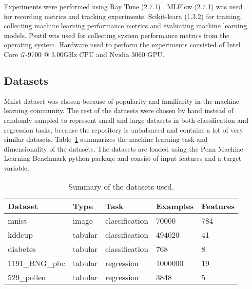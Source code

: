 Experiments were performed using Ray Tune (2.7.1) \parencite{liawTuneResearchPlatform2018}. MLFlow (2.7.1) \parencite{chenDevelopmentsMLflowSystem2020} was used for recording metrics and tracking experiments. Scikit-learn (1.3.2) \parencite{pedregosaScikitlearnMachineLearning2011} for training, collecting machine learning performance metrics and evaluating machine learning models. Psutil \parencite{rodolaGiampaoloPsutil2023} was used for collecting system performance metrics from the operating system. Hardware used to perform the experiments consisted of Intel Core i7-9700 @ 3.00GHz CPU and Nvidia 3060 GPU.

\subsection{Datasets}


Mnist dataset was chosen because of popularity and familiarity in the machine learning community. The rest of the datasets were chosen by hand instead of randomly sampled to represent small and large datasets in both classification and regression tasks, because the repository is unbalanced and contains a lot of very similar datasets. Table~\ref{table:datasets} summarizes the machine learning task and dimensionality of the datasets. The datasets are loaded using the Penn Machine Learning Benchmark \parencite{olsonPMLBLargeBenchmark2017} python package and consist of input features and a target variable.

\begin{table}[h]
    \centering
    \begin{tabular}{lllll}
        \toprule
        Dataset        & Type    & Task           & Examples & Features \\
        \midrule
        mnist          & image   & classification & 70000    & 784      \\
        kddcup         & tabular & classification & 494020   & 41       \\
        diabetes       & tabular & classification & 768      & 8        \\
        1191\_BNG\_pbc & tabular & regression     & 1000000  & 19       \\
        529\_pollen    & tabular & regression     & 3848     & 5        \\
        \bottomrule
    \end{tabular}
    \caption{Summary of the datasets used.}
    \label{table:datasets}
\end{table}

